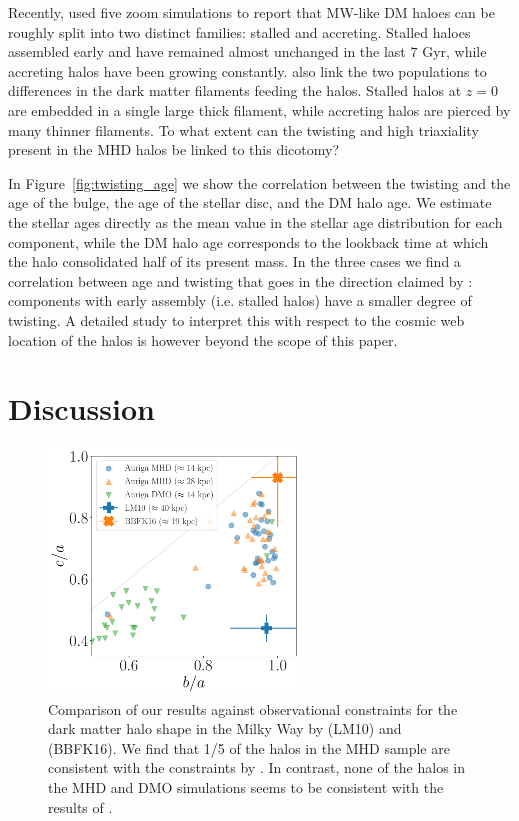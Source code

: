 \documentclass[usenatbib]{mnras}
\begin{document}
Recently, \citet{2017MNRAS.469..594B} used five zoom simulations 
to report that MW-like DM haloes can be roughly split into two
distinct families: stalled and accreting. 
Stalled haloes assembled early and have remained almost unchanged
in the last $7$ Gyr, while accreting halos have been growing
constantly. \citet{2017MNRAS.469..594B} also link the two populations to
differences in the dark matter filaments feeding the halos. 
Stalled halos at $z=0$ are embedded in a single large thick filament, while
accreting halos are pierced by many thinner filaments. 
To what extent can the twisting and high triaxiality present in the MHD
halos be linked to this dicotomy?

In Figure~\ref{fig:twisting_age} we show the correlation between the
twisting and the age of the bulge, the age of the stellar disc, and the
DM halo age.
We estimate the stellar ages  directly as the mean value in the
stellar age distribution for each component, while the
DM halo age corresponds to the lookback time at which the halo
consolidated half of its present mass.  
In the three cases we find a correlation between age and twisting
that goes in the direction claimed by \citet{2017MNRAS.469..594B}:
components with early assembly (i.e. stalled halos) have a smaller degree of
twisting. 
A detailed study to interpret this with respect to the cosmic 
web location of the halos is however beyond the scope of this paper.

\section{Discussion}
\label{sec:discussion}

\begin{figure}
\begin{center}
\includegraphics[width=0.6\textwidth]{triaxiality_observations.pdf}
\end{center}
\caption{Comparison of our results against 
observational constraints for the 
dark matter halo shape in the Milky Way by \citet{LM10} (LM10) and
\citet{Bovy16} (BBFK16).   
We find that 1/5 of the halos in the MHD  sample are consistent with
the constraints by \citet{Bovy16}.
In contrast, none of the halos in the MHD and DMO simulations seems to be
consistent with the results of \citet{LM10}.}
\label{fig:observations}
\end{figure}
\end{document}
